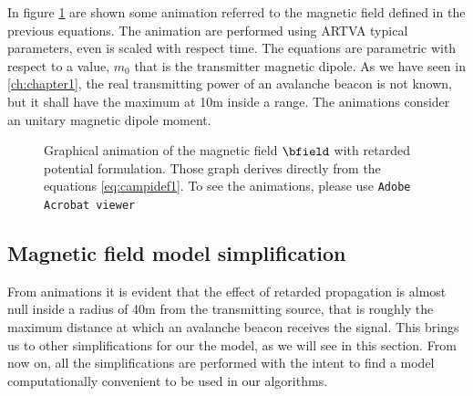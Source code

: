 In figure \ref{fig:animazionifield} are shown some animation referred to the magnetic field defined in the previous equations. The animation are performed using ARTVA typical parameters, even is scaled with respect time. The equations are parametric with respect to a value, $m_0$ that is the transmitter magnetic dipole. As we have seen in \ref{ch:chapter1}, the real transmitting power of an avalanche beacon is not known, but it shall have the maximum at \num{10}\si{\meter} inside a range. The animations consider an unitary magnetic dipole moment.

\begin{figure}[p]
\label{fig:animazionifield}
 \newline
{}
 \newline
{} 
\caption{Graphical animation of the magnetic field $\bfield$ with retarded potential formulation. Those graph derives directly from the equations \ref{eq:campidef1}. To see the animations, please use \texttt{Adobe Acrobat viewer}}
\end{figure}
\FloatBarrier

\subsection{Magnetic field model simplification}
From animations it is evident that the effect of retarded propagation is almost null inside a radius of \num{40}\si{\meter} from the transmitting source, that is roughly the maximum distance at which an avalanche beacon receives the signal. This brings us to other simplifications for our the model, as we will see in this section. From now on, all the simplifications are performed with the intent to find a model computationally convenient to be used in our algorithms.

